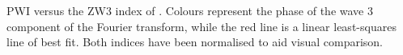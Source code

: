 \label{fig:metric_vs_zw3}
PWI versus the ZW3 index of \citet{Raphael2004}. Colours represent the phase of the wave 3 component of the Fourier transform, while the red line is a linear least-squares line of best fit. Both indices have been normalised to aid visual comparison.